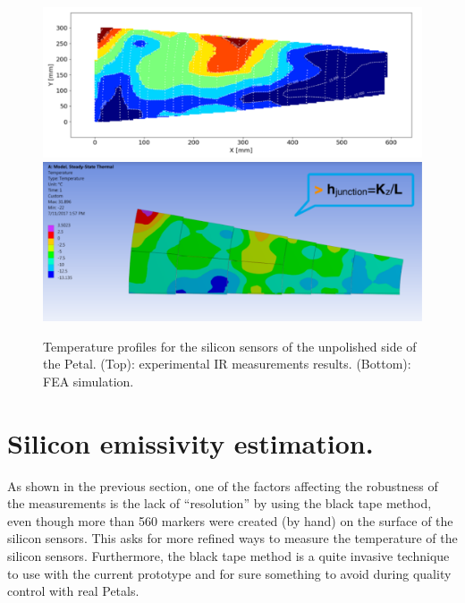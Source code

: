 		\begin{figure}[ht!]
			\centering
			\captionsetup{justification=centering,margin=0cm}
			\includegraphics[scale=0.35]{Figures/Chapter04/PetalLinearInterpolation.pdf}
			\includegraphics[scale=0.35]{Figures/Chapter04/PetalFEA.pdf}
			\caption{Temperature profiles for the silicon sensors of the unpolished side of the Petal. (Top): experimental IR measurements results. (Bottom): FEA simulation.}\label{fig4.3}
		\end{figure}	
	
	\section{Silicon emissivity estimation.}\label{section4.3}	
	
		As shown in the previous section, one of the factors affecting the robustness of the measurements is the lack of “resolution” by using the black tape method, even though more than 560 markers were created (by hand) on the surface of the silicon sensors. This asks for more refined ways to measure the temperature of the silicon sensors. Furthermore, the black tape method is a quite invasive technique to use with the current prototype and for sure something to avoid during quality control with real Petals.
		
